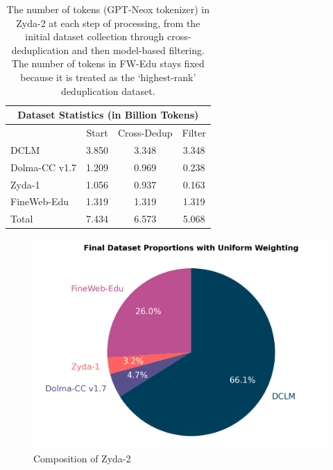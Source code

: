 \documentclass[conference]{IEEEtran}
\begin{document}
\begin{table}[h]
\begin{center}
\begin{threeparttable}
\caption{The number of tokens (GPT-Neox tokenizer) in Zyda-2 at each step of processing, from the initial dataset collection through cross-deduplication and then model-based filtering. The number of tokens in FW-Edu stays fixed because it is treated as the `highest-rank' deduplication dataset.}\label{table:table_dataset_stages}
\begin{tabular}{l c c c}
\toprule
\multicolumn{4}{c}{\textbf{Dataset Statistics} (in Billion Tokens)} \\
\hline
& Start & Cross-Dedup & Filter \\
\hline
DCLM            & 3.850 & 3.348 & 3.348 \\
Dolma-CC v1.7   & 1.209 & 0.969 & 0.238 \\
Zyda-1          & 1.056 & 0.937 & 0.163 \\
FineWeb-Edu     & 1.319 & 1.319 & 1.319 \\
\midrule
\midrule
Total & 7.434 & 6.573 & 5.068 \\
\bottomrule
\end{tabular}
\end{threeparttable}
\end{center}
\end{table}

\begin{figure}
    \centering
    \includegraphics[width=0.9\linewidth]{figures/Zyda_uniform_pie_chart.png}
    \caption{Composition of Zyda-2}
  \label{fig:uniform_weighting_pie}
\end{figure}
\end{document}
